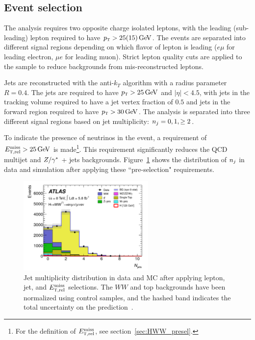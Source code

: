 \subsection{Event selection}

The analysis requires two opposite charge isolated leptons, with the leading (sub-leading) lepton required to have $\pT > 25 (15) \GeV$. The events are separated into different signal regions depending on which flavor of lepton is leading ($e\mu$ for leading electron, $\mu e$ for leading muon). Strict lepton quality cuts are applied to the sample to reduce backgrounds from mis-reconstructed leptons.

Jets are reconstructed with the anti-$k_{T}$ algorithm with a radius parameter $R = 0.4$. The jets are required to have $\pT > 25 \GeV$ and $|\eta| < 4.5$, with jets in the tracking volume required to have a jet vertex fraction of $0.5$ and jets in the forward region required to have $\pT > 30 \GeV$. The analysis is separated into three different signal regions based on jet multiplicity: $n_j = 0, 1, \geq 2$. 

To indicate the presence of neutrinos in the event, a requirement of $\METrel > 25 \GeV$ is made\footnote{For the definition of $E_{{\textrm{\footnotesize\sc t}},{\rm rel}}^{\rm miss}$, see section~\ref{sec:HWW_presel}.}. This requirement significantly reduces the QCD multijet and $Z/\gamma^{\ast}$ + jets backgrounds. Figure~\ref{fig:disc_njet} shows the distribution of $n_j$ in data and simulation after applying these ``pre-selection" requirements. 

\begin{figure}[h!]
  \centering
  \captionsetup{justification=centering}
  \includegraphics[width=0.6\textwidth]{figures/disc_njet}
  \caption{Jet multiplicity distribution in data and MC after applying lepton, jet, and $E_{{\textrm{\footnotesize\sc t}},{\rm rel}}^{\rm miss}$ selections. The $WW$ and top backgrounds have been normalized using control samples, and the hashed band indicates the total uncertainty on the prediction~\cite{Discovery}.}
  \label{fig:disc_njet}
\end{figure}

